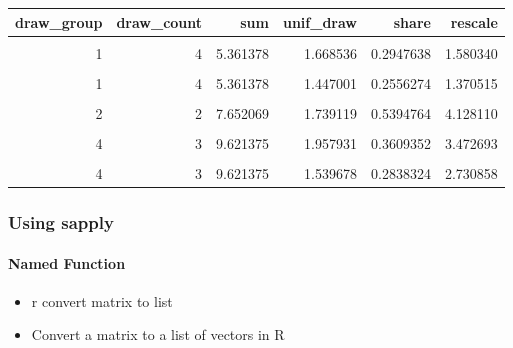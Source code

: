 \documentclass[
]{book}
\providecommand{\tightlist}{%
  \setlength{\itemsep}{0pt}\setlength{\parskip}{0pt}}
\begin{document}
\begin{table}[!h]
\centering
\begin{tabular}{r|r|r|r|r|r}
\hline
draw\_group & draw\_count & sum & unif\_draw & share & rescale\\
\hline
\cellcolor{gray!6}{1} & \cellcolor{gray!6}{4} & \cellcolor{gray!6}{5.361378} & \cellcolor{gray!6}{1.125668} & \cellcolor{gray!6}{0.1988606} & \cellcolor{gray!6}{1.066167}\\
\hline
1 & 4 & 5.361378 & 1.668536 & 0.2947638 & 1.580340\\
\hline
\cellcolor{gray!6}{1} & \cellcolor{gray!6}{4} & \cellcolor{gray!6}{5.361378} & \cellcolor{gray!6}{1.419382} & \cellcolor{gray!6}{0.2507483} & \cellcolor{gray!6}{1.344356}\\
\hline
1 & 4 & 5.361378 & 1.447001 & 0.2556274 & 1.370515\\
\hline
\cellcolor{gray!6}{2} & \cellcolor{gray!6}{2} & \cellcolor{gray!6}{7.652069} & \cellcolor{gray!6}{1.484598} & \cellcolor{gray!6}{0.4605236} & \cellcolor{gray!6}{3.523959}\\
\hline
2 & 2 & 7.652069 & 1.739119 & 0.5394764 & 4.128110\\
\hline
\cellcolor{gray!6}{3} & \cellcolor{gray!6}{1} & \cellcolor{gray!6}{9.572211} & \cellcolor{gray!6}{1.952468} & \cellcolor{gray!6}{1.0000000} & \cellcolor{gray!6}{9.572211}\\
\hline
4 & 3 & 9.621375 & 1.957931 & 0.3609352 & 3.472693\\
\hline
\cellcolor{gray!6}{4} & \cellcolor{gray!6}{3} & \cellcolor{gray!6}{9.621375} & \cellcolor{gray!6}{1.926995} & \cellcolor{gray!6}{0.3552324} & \cellcolor{gray!6}{3.417824}\\
\hline
4 & 3 & 9.621375 & 1.539678 & 0.2838324 & 2.730858\\
\hline
\end{tabular}
\end{table}

\hypertarget{using-sapply}{%
\subsubsection{Using sapply}\label{using-sapply}}

\hypertarget{named-function-1}{%
\paragraph{Named Function}\label{named-function-1}}

\begin{itemize}
\tightlist
\item
  r convert matrix to list
\item
  Convert a matrix to a list of vectors in R
\end{itemize}
\end{document}
